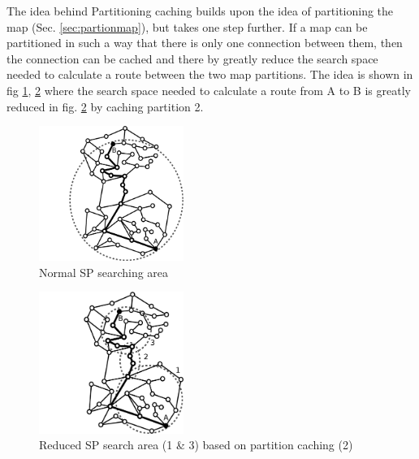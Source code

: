 The idea behind Partitioning caching builds upon the idea of partitioning the map (Sec. \ref{sec:partionmap}), but takes one step further. If a map can be partitioned in such a way that there is only one connection between them, then the connection can be cached and there by greatly reduce the search space needed to calculate a route between the two map partitions. The idea is shown in fig \ref{fig:cacheB}, \ref{fig:cacheA} where the search space needed to calculate a route from A to B is greatly reduced in fig. \ref{fig:cacheA} by caching partition 2.

\begin{figure}
  \center
	\includegraphics[width=0.42\textwidth]{figures/partSPcacheB.pdf}
	\caption{Normal SP searching area}
  \label{fig:cacheB}
\end{figure}

\begin{figure}
  \center
	\includegraphics[width=0.42\textwidth]{figures/partSPcacheA.pdf}
	\caption{Reduced SP search area (1 \& 3) based on partition caching (2)}
  \label{fig:cacheA}
\end{figure}


